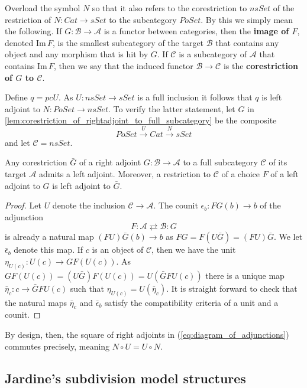 Overload the symbol $N$ so that it also refers to the corestriction to $nsSet$ of the restriction of $N:Cat\to sSet$ to the subcategory $PoSet$. By this we simply mean the following. If $G:\mathscr{B} \to \mathscr{A}$ is a functor between categories, then the \textbf{image of $F$}, denoted $\textrm{Im} \, F$, is the smallest subcategory of the target $\mathscr{B}$ that contains any object and any morphism that is hit by $G$. If $\mathscr{C}$ is a subcategory of $\mathscr{A}$ that contains $\textrm{Im} \, F$, then we say that the induced functor $\mathscr{B} \to \mathscr{C}$ is the \textbf{corestriction of $G$ to $\mathscr{C}$}.

Define $q=pcU$. As $U:nsSet\to sSet$ is a full inclusion it follows that $q$ is left adjoint to $N:PoSet\to nsSet$. To verify the latter statement, let $G$ in \cref{lem:corestriction_of_rightadjoint_to_full_subcategory} be the composite
\[PoSet\xrightarrow{U} Cat\xrightarrow{N} sSet\]
and let $\mathscr{C} =nsSet$.
\begin{lemma}\label{lem:corestriction_of_rightadjoint_to_full_subcategory}
Any corestriction $\bar{G}$ of a right adjoint $G:\mathscr{B} \to \mathscr{A}$ to a full subcategory $\mathscr{C}$ of its target $\mathscr{A}$ admits a left adjoint. Moreover, a restriction to $\mathscr{C}$ of a choice $F$ of a left adjoint to $G$ is left adjoint to $\bar{G}$.
\end{lemma}
\begin{proof}
Let $U$ denote the inclusion $\mathscr{C} \to \mathscr{A}$. The counit $\epsilon _b:FG(b)\to b$ of the adjunction
\[F:\mathscr{A} \rightleftarrows \mathscr{B} :G\]
is already a natural map $(FU)\bar{G} (b)\to b$ as $FG=F(U\bar{G} )=(FU)\bar{G}$. We let $\bar{\epsilon } _b$ denote this map. If $c$ is an object of $\mathscr{C}$, then we have the unit $\eta _{U(c)}:U(c)\to GF(U(c))$. As $GF(U(c))=(U\bar{G} )F(U(c))=U(\bar{G} FU(c))$ there is a unique map $\bar{\eta } _c:c\to \bar{G} FU(c)$ such that $\eta _{U(c)}=U(\bar{\eta } _c)$. It is straight forward to check that the natural maps $\bar{\eta } _c$ and $\bar{\epsilon } _b$ satisfy the compatibility criteria of a unit and a counit.
\end{proof}
\noindent By design, then, the square of right adjoints in (\ref{eq:diagram_of_adjunctions}) commutes precisely, meaning $N\circ U=U\circ N$.


\subsection{Jardine's subdivision model structures}

